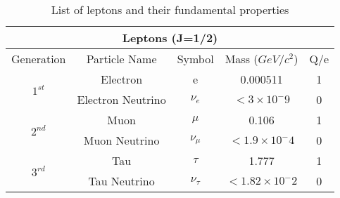 \begin{table}[!htb]
  \centering
  \begin{tabular}{|c|c|c|c|c|}
  \hline
  \multicolumn{5}{|c|}{Leptons (J=1/2)} \\
  \hline
  Generation & Particle Name & Symbol & Mass ($GeV/c^2$) & Q/e \\
  \hline
  \hline
  \multirow{2}{*}{$1^{st}$} & Electron          & e          &           0.000511    & 1 \\
                            & Electron Neutrino & $\nu_e$    & $< 3 \times 10^-9$    & 0 \\
  \hline
  \hline
  \multirow{2}{*}{$2^{nd}$} & Muon              & $\mu$      &              0.106    & 1 \\
                            & Muon Neutrino     & $\nu_\mu$  & $< 1.9 \times 10^-4$  & 0 \\
  \hline
  \hline
  \multirow{2}{*}{$3^{rd}$} & Tau               & $\tau$     & 1.777                 & 1 \\
                            & Tau Neutrino      & $\nu_\tau$ & $< 1.82 \times 10^-2$ & 0 \\
  \hline
  \end{tabular}
  \caption[List of leptons and their fundamental properties]{List of leptons and their fundamental properties}
  \label{TheoreticalIntroduction_LeptonProperties}
\end{table}
